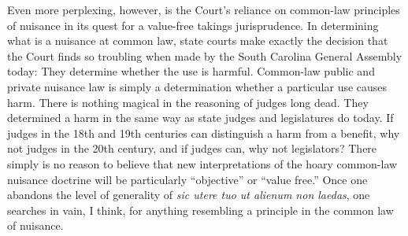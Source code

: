 
Even more perplexing, however, is the Court's reliance on common-law principles
of nuisance in its quest for a value-free takings jurisprudence. In determining
what is a nuisance at common law, state courts make exactly the decision that
the Court finds so troubling when made by the South Carolina General Assembly
today: They determine whether the use is harmful. Common-law public and private
nuisance law is simply a determination whether a particular use causes harm.
There is nothing magical in the reasoning of judges long dead. They determined a
harm in the same way as state judges and legislatures do today. If judges in the
18th and 19th centuries can distinguish a harm from a benefit, why not judges in
the 20th century, and if judges can, why not legislators? There simply is no
reason to believe that new interpretations of the hoary common-law nuisance
doctrine will be particularly ``objective'' or ``value free.'' Once one abandons
the level of generality of \textit{sic utere tuo ut alienum non laedas}, one
searches in vain, I think, for anything resembling a principle in the common law
of nuisance.

